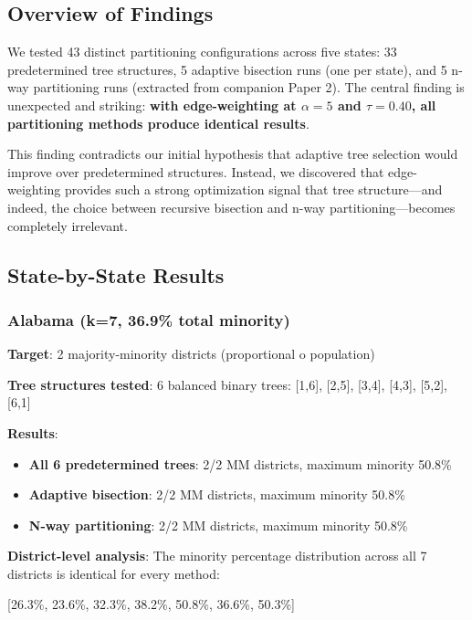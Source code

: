 \subsection{Overview of Findings}

We tested 43 distinct partitioning configurations across five states: 33 predetermined tree structures, 5 adaptive bisection runs (one per state), and 5 n-way partitioning runs (extracted from companion Paper 2). The central finding is unexpected and striking: \textbf{with edge-weighting at $\alpha = 5$ and $\tau = 0.40$, all partitioning methods produce identical results}.

This finding contradicts our initial hypothesis that adaptive tree selection would improve over predetermined structures. Instead, we discovered that edge-weighting provides such a strong optimization signal that tree structure—and indeed, the choice between recursive bisection and n-way partitioning—becomes completely irrelevant.

\subsection{State-by-State Results}

\subsubsection{Alabama (k=7, 36.9\% total minority)}

\textbf{Target}: 2 majority-minority districts (proportional 	o population)

\textbf{Tree structures tested}: 6 balanced binary trees: [1,6], [2,5], [3,4], [4,3], [5,2], [6,1]

\textbf{Results}:
\begin{itemize}
\item \textbf{All 6 predetermined trees}: 2/2 MM districts, maximum minority 50.8\%
\item \textbf{Adaptive bisection}: 2/2 MM districts, maximum minority 50.8\%
\item \textbf{N-way partitioning}: 2/2 MM districts, maximum minority 50.8\%
\end{itemize}

\textbf{District-level analysis}: The minority percentage distribution across all 7 districts is identical for every method:
\begin{center}
[26.3\%, 23.6\%, 32.3\%, 38.2\%, 50.8\%, 36.6\%, 50.3\%]
\end{center}

